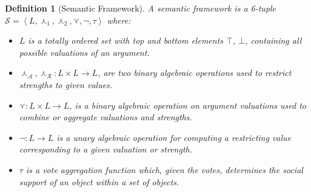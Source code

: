 \documentclass{article}
\newtheorem{definition}{Definition}
\newcommand{\args}{\mathcal{A}} %
\newcommand{\att}{\mathcal{R}}  %
\newcommand{\valueset}{L}
\newcommand{\sembody}{\left\langle \valueset,\SAFand_1, \SAFand_2,\SAFor,\lnot,\tau \right\rangle}
\newcommand{\SAFand}{\curlywedge}     %
\newcommand{\SAFor}{\curlyvee}        %
\newcommand{\sem}{\mathcal{S}}
\begin{document}
\begin{definition}[Semantic Framework]
\label{def:semfram}
A semantic framework is a 6-tuple $\sem=\sembody$ where:

\begin{itemize}
  \item $\valueset$ is a totally ordered set with top and bottom elements $\top$, 
$\bot$, containing all possible valuations of an argument. 

  \item $\SAFand_\args,\SAFand_\att:\valueset\times \valueset\rightarrow \valueset$, are two binary algebraic operations used to restrict strengths to given values.
  
  \item $\SAFor:\valueset\times \valueset\rightarrow \valueset$, is a binary algebraic operation on argument valuations used to combine or aggregate valuations and strengths.
  
  \item $\lnot:\valueset\rightarrow \valueset$ is a unary algebraic operation for computing a restricting value corresponding to a given valuation or strength.
  

  \item $\tau$ is a vote aggregation function which, given the votes, determines the social support of an object within a set of objects.

\end{itemize}
\end{definition}
\end{document}
